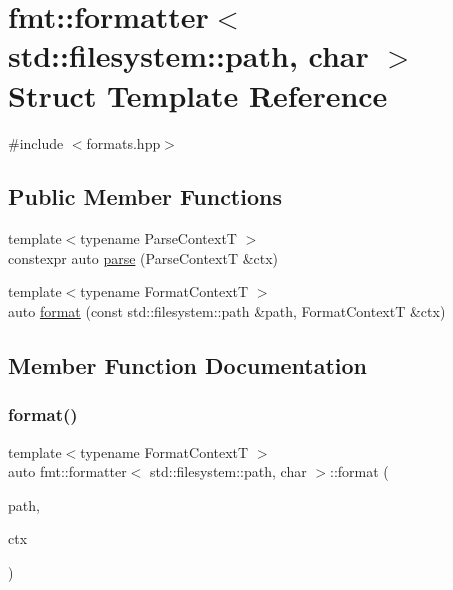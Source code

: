 \hypertarget{structfmt_1_1formatter_3_01std_1_1filesystem_1_1path_00_01char_01_4}{}\section{fmt\+:\+:formatter$<$ std\+:\+:filesystem\+:\+:path, char $>$ Struct Template Reference}
\label{structfmt_1_1formatter_3_01std_1_1filesystem_1_1path_00_01char_01_4}


{\ttfamily \#include $<$formats.\+hpp$>$}

\subsection*{Public Member Functions}
\begin{DoxyCompactItemize}
\item 
{\footnotesize template$<$typename Parse\+ContextT $>$ }\\constexpr auto \mbox{\hyperlink{structfmt_1_1formatter_3_01std_1_1filesystem_1_1path_00_01char_01_4_ad80014aaaa6af2e67c3f1a8f0dd7a5d5}{parse}} (Parse\+ContextT \&ctx)
\item 
{\footnotesize template$<$typename Format\+ContextT $>$ }\\auto \mbox{\hyperlink{structfmt_1_1formatter_3_01std_1_1filesystem_1_1path_00_01char_01_4_aa3e8ffffdd239f1be9edba7881b76e10}{format}} (const std\+::filesystem\+::path \&path, Format\+ContextT \&ctx)
\end{DoxyCompactItemize}


\subsection{Member Function Documentation}
\mbox{\label{structfmt_1_1formatter_3_01std_1_1filesystem_1_1path_00_01char_01_4_aa3e8ffffdd239f1be9edba7881b76e10}} 
\subsubsection{\texorpdfstring{format()}{format()}}
{\footnotesize\ttfamily template$<$typename Format\+ContextT $>$ \\
auto fmt\+::formatter$<$ std\+::filesystem\+::path, char $>$\+::format (\begin{DoxyParamCaption}\item[{const std\+::filesystem\+::path \&}]{path,  }\item[{Format\+ContextT \&}]{ctx }\end{DoxyParamCaption})}

